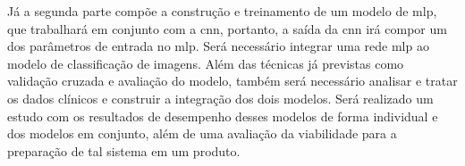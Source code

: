 Já a segunda parte compõe a construção e treinamento de um modelo de \gls{mlp}, que trabalhará em conjunto com a \gls{cnn}, portanto, a saída da \gls{cnn} irá compor um dos parâmetros de entrada no \gls{mlp}. Será necessário integrar uma rede \gls{mlp} ao modelo de classificação de imagens. Além das técnicas já previstas como validação cruzada e avaliação do modelo, também será necessário analisar e tratar os dados clínicos e construir a integração dos dois modelos. Será realizado um estudo com os resultados de desempenho desses modelos de forma individual e dos modelos em conjunto, além de uma avaliação da viabilidade para a preparação de tal sistema em um produto.
%
%
%
%
%
%
%
%
